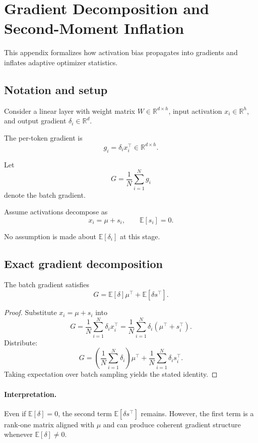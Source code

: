 \section{Gradient Decomposition and Second-Moment Inflation}
\label{app:gradient_proof}

This appendix formalizes how activation bias propagates into gradients and
inflates adaptive optimizer statistics.

\subsection{Notation and setup}

Consider a linear layer with weight matrix $W \in \mathbb{R}^{d \times h}$,
input activation $x_i \in \mathbb{R}^{h}$,
and output gradient $\delta_i \in \mathbb{R}^{d}$.

The per-token gradient is
\[
g_i = \delta_i x_i^\top \in \mathbb{R}^{d \times h}.
\]

Let
\[
G = \frac{1}{N} \sum_{i=1}^N g_i
\]
denote the batch gradient.

Assume activations decompose as
\[
x_i = \mu + s_i,
\qquad
\mathbb{E}[s_i] = 0.
\]

No assumption is made about $\mathbb{E}[\delta_i]$ at this stage.

\subsection{Exact gradient decomposition}

\begin{lemma}
\label{lem:grad_decomp}
The batch gradient satisfies
\[
G
=
\mathbb{E}[\delta]\mu^\top
+
\mathbb{E}[\delta s^\top].
\]
\end{lemma}

\begin{proof}
Substitute $x_i = \mu + s_i$ into
\[
G = \frac{1}{N}\sum_{i=1}^N \delta_i x_i^\top
=
\frac{1}{N}\sum_{i=1}^N \delta_i(\mu^\top + s_i^\top).
\]
Distribute:
\[
G
=
\left(\frac{1}{N}\sum_{i=1}^N \delta_i\right)\mu^\top
+
\frac{1}{N}\sum_{i=1}^N \delta_i s_i^\top.
\]
Taking expectation over batch sampling yields the stated identity.
\end{proof}

\paragraph{Interpretation.}
Even if $\mathbb{E}[\delta]=0$, the second term
$\mathbb{E}[\delta s^\top]$ remains.
However, the first term is a rank-one matrix aligned with $\mu$ and can
produce coherent gradient structure whenever $\mathbb{E}[\delta]\neq 0$.

